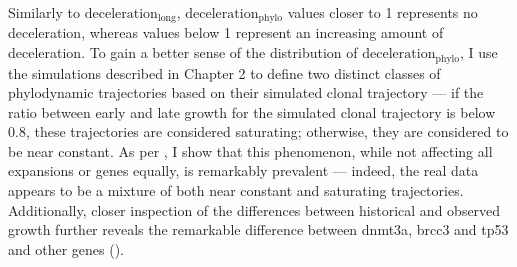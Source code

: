 Similarly to $\mathrm{deceleration}_{\mathrm{long}}$, $\mathrm{deceleration}_{\mathrm{phylo}}$ values closer to 1 represents no deceleration, whereas values below 1 represent an increasing amount of deceleration. To gain a better sense of the distribution of $\mathrm{deceleration}_{\mathrm{phylo}}$, I use the simulations described in Chapter 2 to define two distinct classes of phylodynamic trajectories based on their simulated clonal trajectory --- if the ratio between early and late growth for the simulated clonal trajectory is below 0.8, these trajectories are considered saturating; otherwise, they are considered to be near constant. As per , I show that this phenomenon, while not affecting all expansions or genes equally, is remarkably prevalent --- indeed, the real data appears to be a mixture of both near constant and saturating trajectories. Additionally, closer inspection of the differences between historical and observed growth further reveals the remarkable difference between \ac{dnmt3a}, \ac{brcc3} and \ac{tp53} and other genes ().

\begin{figure}[!ht]
	\label{fig:historical-growth-representation}
\end{figure}

\begin{figure}[!ht]
	\label{fig:deceleration-figure-full}
\end{figure}

\begin{figure}[!ht]
	\label{fig:historical-growth-tally}
\end{figure}

